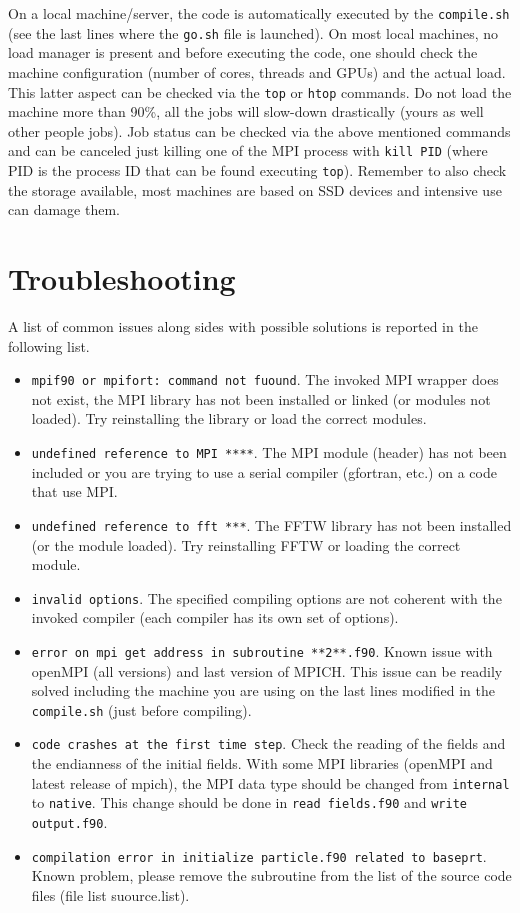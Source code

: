 On a local machine/server, the code is automatically executed by the \texttt{compile.sh} (see the last lines where the \texttt{go.sh} file is launched).
On most local machines, no load manager is present and before executing the code, one should check the machine configuration (number of cores, threads and GPUs) and the actual load.
This latter aspect can be checked via the \texttt{top} or \texttt{htop} commands.
Do not load the machine more than 90\%, all the jobs will slow-down drastically (yours as well other people jobs).
Job status can be checked via the above mentioned commands and can be canceled just killing one of the MPI process with \texttt{kill PID} (where PID is the process ID that can be found executing \texttt{top}).
Remember to also check the storage available, most machines are based on SSD devices and intensive use can damage them.




\section{Troubleshooting}

A list of common issues along sides with possible solutions is reported in the following list.
\begin{itemize}
\item \texttt{mpif90 or mpifort: command not fuound}. The invoked MPI wrapper does not exist, the MPI library has not been installed or linked (or modules not loaded). Try reinstalling the library or load the correct modules. 
\item \texttt{undefined reference to MPI ****}. The MPI module (header) has not been included or you are trying to use a serial compiler (gfortran, etc.) on a code that use MPI.
\item \texttt{undefined reference to fft ***}. The FFTW library has not been installed (or the module loaded). Try reinstalling FFTW or loading the correct module.
\item \texttt{invalid options}. The specified compiling options are not coherent with the invoked compiler (each compiler has its own set of options).
\item \texttt{error on mpi get address in subroutine **2**.f90}. Known issue with openMPI (all versions) and last version of MPICH. This issue can be readily solved including the machine you are using on the last lines modified in the \texttt{compile.sh} (just before compiling).
\item \texttt{code crashes at the first time step}. Check the reading of the fields and the endianness of the initial fields. With some MPI libraries (openMPI and latest release of mpich), the MPI data type should be changed from \texttt{internal} to \texttt{native}. This change should be done in \texttt{read fields.f90} and \texttt{write output.f90}.
\item \texttt{compilation error in initialize particle.f90 related to baseprt}. Known problem, please remove the subroutine from the list of the source code files (file list suource.list).
\end{itemize}



